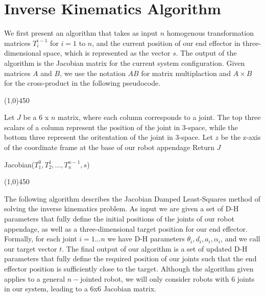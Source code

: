 \section{Inverse Kinematics Algorithm}
We first present an algorithm that takes as input $n$ homogenous transformation matrices $T^{i-1}_i$ for $i=1$ to $n$, and
the current position of our end effector in three-dimensional space, which is represented as the vector $s$. 
The output of the algorithm is the Jacobian matrix for the current system configuration. Given matrices $A$ and $B$, we use the notation
$AB$ for matrix multiplaction and $A \times B$ for the cross-product in the following pseudocode.\\

\begin{center}
\line(1,0){450}
\end{center}
\begin{algorithm}[H]
\DontPrintSemicolon
Let $J$ be a 6 x $n$ matrix, where each column corresponds to a joint. The top three scalars of a column represent the
position of the joint in 3-space, while the bottom three represent the oritentation of the joint in 3-space.\;
Let $z$ be the z-axis of the coordinate frame at the base of our robot appendage\;
Return $J$
\caption{Jacobian($T^0_1, T^1_2, \ldots, T^{n-1}_n, s$)\label{IR}}
\begin{center}
\noindent\line(1,0){450}
\end{center}
\end{algorithm}
\vspace{2mm}

The following algorithm describes the Jacobian Damped Least-Squares method of solving the inverse kinematics problem. 
As input we are given a set of D-H parameters that fully define
the initial positions of the joints of our robot appendage, as well as a three-dimensional target position for our end effector. 
Formally, for each joint $i = 1 \ldots n$ we have D-H parameters $\theta_i, d_i, a_i, \alpha_i$, and
we call our target vector $t$. The final output of our algorithm is a set of updated D-H parameters that fully define
the required position of our joints such that the end effector position is sufficiently close to the target.
Although the algorithm given applies to a general $n-$jointed robot, we will only consider robots with 6 joints in our system, leading
to a 6x6 Jacobian matrix.


